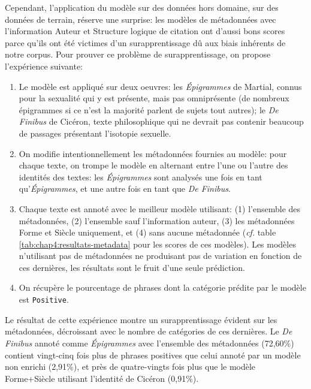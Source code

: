 Cependant, l'application du modèle sur des données hors domaine, sur des données de terrain, réserve une surprise: les modèles de métadonnées avec l'information Auteur et Structure logique de citation ont d'aussi bons scores parce qu'ils ont été victimes d'un surapprentissage dû aux biais inhérents de notre corpus. Pour prouver ce problème de surapprentissage, on propose l'expérience suivante:
\begin{enumerate}
    \item Le modèle est appliqué sur deux oeuvres: les \textit{Épigrammes} de Martial, connus pour la sexualité qui y est présente, mais pas omniprésente (de nombreux épigrammes si ce n'est la majorité parlent de sujets tout autres); le \textit{De Finibus} de Cicéron, texte philosophique qui ne devrait pas contenir beaucoup de passages présentant l'isotopie sexuelle.
    \item On modifie intentionnellement les métadonnées fournies au modèle: pour chaque texte, on trompe le modèle en alternant entre l'une ou l'autre des identités des textes: les \textit{Épigrammes} sont analysés une fois en tant qu'\textit{Épigrammes}, et une autre fois en tant que \textit{De Finibus}.
    \item Chaque texte est annoté avec le meilleur modèle utilisant: (1) l'ensemble des métadonnées, (2) l'ensemble sauf l'information auteur, (3) les métadonnées Forme et Siècle uniquement, et (4) sans aucune métadonnée (\textit{cf.} table \ref{tab:chap4:resultats-metadata} pour les scores de ces modèles). Les modèles n'utilisant pas de métadonnées ne produisant pas de variation en fonction de ces dernières, les résultats sont le fruit d'une seule prédiction.
    \item On récupère le pourcentage de phrases dont la catégorie prédite par le modèle est \texttt{Positive}.
\end{enumerate}
Le résultat de cette expérience montre un surapprentissage évident sur les métadonnées, décroissant avec le nombre de catégories de ces dernières. Le \textit{De Finibus} annoté comme \textit{Épigrammes} avec l'ensemble des métadonnées (72,60\%) contient vingt-cinq fois plus de phrases positives que celui annoté   par un modèle non enrichi (2,91\%), et près de quatre-vingts fois plus que le modèle Forme+Siècle utilisant l'identité de Cicéron (0,91\%).

